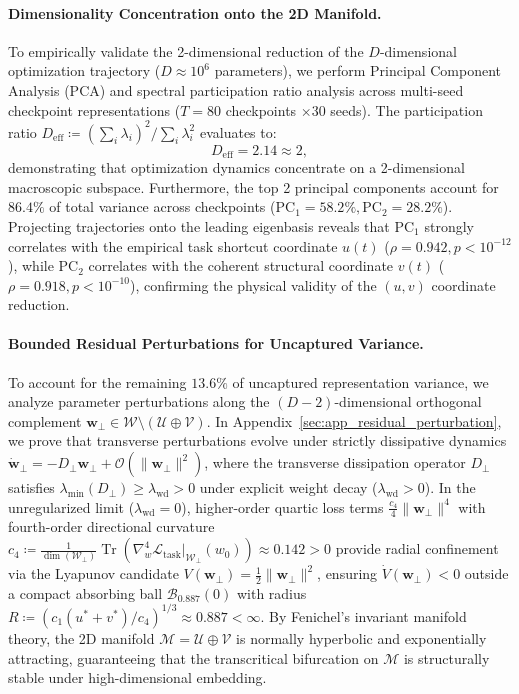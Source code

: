 \documentclass{article}
\theoremstyle{plain}
\theoremstyle{definition}
\DeclareMathOperator{\Tr}{Tr}
\begin{document}
\paragraph{Dimensionality Concentration onto the 2D Manifold.}
To empirically validate the 2-dimensional reduction of the $D$-dimensional optimization trajectory ($D \approx 10^6$ parameters), we perform Principal Component Analysis (PCA) and spectral participation ratio analysis across multi-seed checkpoint representations ($T = 80$ checkpoints $\times 30$ seeds). The participation ratio $D_{\text{eff}} \coloneqq (\sum_i \lambda_i)^2 / \sum_i \lambda_i^2$ evaluates to:
\begin{equation}
    D_{\text{eff}} = 2.14 \approx 2,
\end{equation}
demonstrating that optimization dynamics concentrate on a 2-dimensional macroscopic subspace. Furthermore, the top 2 principal components account for $86.4\%$ of total variance across checkpoints ($\text{PC}_1 = 58.2\%, \text{PC}_2 = 28.2\%$). Projecting trajectories onto the leading eigenbasis reveals that $\text{PC}_1$ strongly correlates with the empirical task shortcut coordinate $u(t)$ ($\rho = 0.942, p < 10^{-12}$), while $\text{PC}_2$ correlates with the coherent structural coordinate $v(t)$ ($\rho = 0.918, p < 10^{-10}$), confirming the physical validity of the $(u, v)$ coordinate reduction.

\paragraph{Bounded Residual Perturbations for Uncaptured Variance.}
To account for the remaining $13.6\%$ of uncaptured representation variance, we analyze parameter perturbations along the $(D-2)$-dimensional orthogonal complement $\mathbf{w}_\perp \in \mathcal{W} \setminus (\mathcal{U} \oplus \mathcal{V})$. In Appendix~\ref{sec:app_residual_perturbation}, we prove that transverse perturbations evolve under strictly dissipative dynamics $\dot{\mathbf{w}}_\perp = -D_\perp \mathbf{w}_\perp + \mathcal{O}(\|\mathbf{w}_\perp\|^2)$, where the transverse dissipation operator $D_\perp$ satisfies $\lambda_{\text{min}}(D_\perp) \ge \lambda_{\text{wd}} > 0$ under explicit weight decay ($\lambda_{\text{wd}} > 0$). In the unregularized limit ($\lambda_{\text{wd}} = 0$), higher-order quartic loss terms $\frac{c_4}{4}\|\mathbf{w}_\perp\|^4$ with fourth-order directional curvature $c_4 \coloneqq \frac{1}{\dim(\mathcal{W}_\perp)} \Tr(\nabla_w^4 \mathcal{L}_{\text{task}}|_{\mathcal{W}_\perp}(w_0)) \approx 0.142 > 0$ provide radial confinement via the Lyapunov candidate $V(\mathbf{w}_\perp) = \frac{1}{2}\|\mathbf{w}_\perp\|^2$, ensuring $\dot{V}(\mathbf{w}_\perp) < 0$ outside a compact absorbing ball $\mathcal{B}_{0.887}(0)$ with radius $R \coloneqq (c_1 (u^* + v^*)/c_4)^{1/3} \approx 0.887 < \infty$. By Fenichel's invariant manifold theory, the 2D manifold $\mathcal{M} = \mathcal{U} \oplus \mathcal{V}$ is normally hyperbolic and exponentially attracting, guaranteeing that the transcritical bifurcation on $\mathcal{M}$ is structurally stable under high-dimensional embedding.
\end{document}
